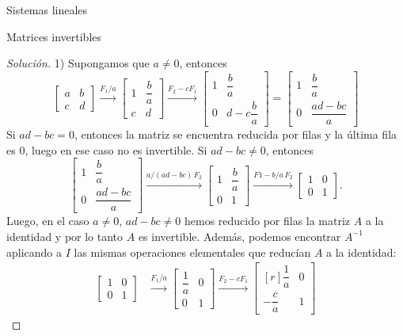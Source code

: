 \documentclass[a4paper,12pt,twoside,spanish]{amsbook}
\theoremstyle{definition}
\theoremstyle{remark}
\begin{document}
\begin{chapter}{Sistemas lineales}
\begin{section}{Matrices invertibles}
\begin{proof}[Solución]
				1) Supongamos que  $a\not=0$, entonces 
				\begin{equation*}
				\begin{bmatrix}a&b\\c&d\end{bmatrix} \stackrel{F_1/a}{\longrightarrow}
				\begin{bmatrix}1&\dfrac{b}{a}\\[6pt]c&d\end{bmatrix} \stackrel{F_2 -cF_1}{\longrightarrow}
				\begin{bmatrix}1&\dfrac{b}{a}\\[6pt]0&d- c\dfrac{b}{a}\end{bmatrix} =
				\begin{bmatrix}1&\dfrac{b}{a}\\[6pt]0&\dfrac{ad-bc}{a}\end{bmatrix}
				\end{equation*}   
				Si $ad-bc=0$,  entonces la matriz se encuentra reducida por filas y la última fila es $0$, luego en ese caso no es invertible.  Si $ad-bc\not=0$, entonces
				\begin{equation*}
				\begin{bmatrix}1&\dfrac{b}{a}\\[8pt]0&\dfrac{ad-bc}{a}\end{bmatrix} \stackrel{a/(ad-bc)\,F_2}{\longrightarrow}
				\begin{bmatrix}1&\dfrac{b}{a}\\[6pt]0&1\end{bmatrix}
				\stackrel{F1-b/a\,F_2}{\longrightarrow}
				\begin{bmatrix}1&0\\0&1\end{bmatrix}.
				\end{equation*} 
				Luego, en el caso $a\not=0$, $ad-bc\not=0$ hemos reducido por filas la matriz $A$  a la identidad y por lo tanto $A$  es invertible. Además, podemos encontrar $A^{-1}$ aplicando a $I$ las mismas operaciones elementales que reducían $A$ a la identidad:
				\begin{align*}
				\begin{bmatrix}1&0\\0&1\end{bmatrix} 
				&\stackrel{F_1/a}{\longrightarrow}
				\begin{bmatrix}\dfrac1a&0\\[8pt]0&1\end{bmatrix} 
				\stackrel{F_2 -cF_1}{\longrightarrow}
				\begin{bmatrix*}[r]\dfrac1a&0\\[8pt]-\dfrac{c}{a}&1\end{bmatrix*}

\end{align*}
\end{proof}
\end{section}
\end{chapter}
\end{document}
